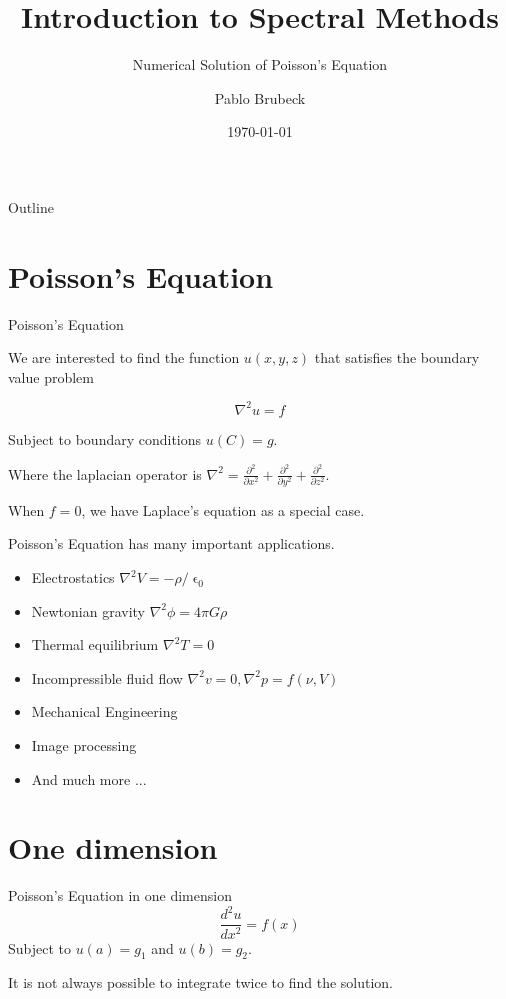 \documentclass[xcolor={dvipsnames}]{beamer}
\title{Introduction to Spectral Methods}
\subtitle{Numerical Solution of Poisson's Equation}
\author{Pablo Brubeck\inst{}}
\institute[ITESM]
{
	\inst{}
	Department of Physics\\
	Tecnologico de Monterrey
}
\date{\today}
\begin{document}
\begin{frame}
	\titlepage
\end{frame}

\begin{frame}{Outline}
	\tableofcontents
\end{frame}


\section{Poisson's Equation}
\begin{frame}{Poisson's Equation}{}

We are interested to find the function $u(x,y,z)$ that satisfies the boundary value problem

\begin{equation*}
\nabla^2 u = f
\end{equation*}

Subject to boundary conditions $u(C)=g$.

\pause
\bigskip
Where the laplacian operator is $\nabla^2=\frac{\partial^2}{\partial x^2}+\frac{\partial^2}{\partial y^2}+\frac{\partial^2}{\partial z^2}$.

\pause
\bigskip
When $f=0$, we have Laplace's equation as a special case.
\end{frame}


\begin{frame}{Poisson's Equation has many important applications.}{}
\begin{itemize}[<+->]
\item Electrostatics $\nabla^2 V = - \rho/\upvarepsilon_0$
\item Newtonian gravity $\nabla^2 \phi = 4\pi G\rho$
\item Thermal equilibrium $\nabla^2 T = 0$
\item Incompressible fluid flow $\nabla^2 v = 0, \nabla^2 p = f(\nu,V)$
\item Mechanical Engineering 
\item Image processing
\item And much more ...
\end{itemize}

\end{frame}


\section{One dimension}
\begin{frame}{Poisson's Equation in one dimension}{}
\begin{equation*}
\frac{d^2u}{dx^2}=f(x)
\end{equation*}
\vfill
Subject to $u(a)=g_1$ and  $u(b)=g_2$.

\bigskip
It is not always possible to integrate twice to find the solution.
\end{frame}
\end{document}
